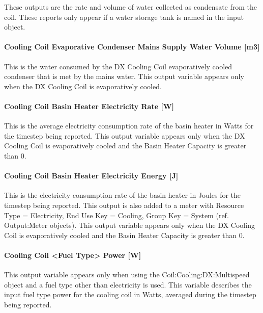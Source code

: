 These outputs are the rate and volume of water collected as condensate from the coil. These reports only appear if a water storage tank is named in the input object.

\paragraph{Cooling Coil Evaporative Condenser Mains Supply Water Volume {[}m3{]}}\label{cooling-coil-evaporative-condenser-mains-supply-water-volume-m3-1}

This is the water consumed by the DX Cooling Coil evaporatively cooled condenser that is met by the mains water. This output variable appears only when the DX Cooling Coil is evaporatively cooled.

\paragraph{Cooling Coil Basin Heater Electricity Rate {[}W{]}}\label{cooling-coil-basin-heater-electric-power-w}

This is the average electricity consumption rate of the basin heater in Watts for the timestep being reported. This output variable appears only when the DX Cooling Coil is evaporatively cooled and the Basin Heater Capacity is greater than 0.

\paragraph{Cooling Coil Basin Heater Electricity Energy {[}J{]}}\label{cooling-coil-basin-heater-electric-energy-j}

This is the electricity consumption rate of the basin heater in Joules for the timestep being reported. This output is also added to a meter with Resource Type = Electricity, End Use Key = Cooling, Group Key = System (ref. Output:Meter objects). This output variable appears only when the DX Cooling Coil is evaporatively cooled and the Basin Heater Capacity is greater than 0.

\paragraph{Cooling Coil \textless{}Fuel Type\textgreater{} Power {[}W{]}}\label{cooling-coil-fuel-type-power-w}

This output variable appears only when using the Coil:Cooling:DX:Multispeed object and a fuel type other than electricity is used. This variable describes the input fuel type power for the cooling coil in Watts, averaged during the timestep being reported.

